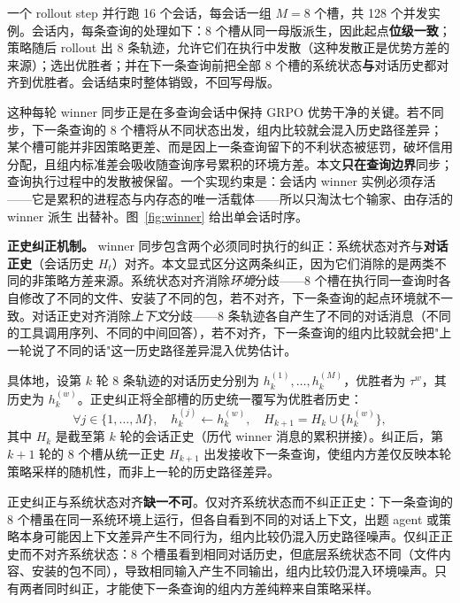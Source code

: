 一个 rollout step 并行跑 16 个会话，每会话一组 $M=8$ 个槽，共 128 个并发实例。会话内，每条查询的处理如下：8 个槽从同一母版派生，因此起点\textbf{位级一致}；策略随后 rollout 出 8 条轨迹，允许它们在执行中发散（这种发散正是优势方差的来源）；选出优胜者；并在下一条查询前把全部 8 个槽的系统状态\textbf{与}对话历史都对齐到优胜者。会话结束时整体销毁，不回写母版。

这种每轮 winner 同步正是在多查询会话中保持 GRPO 优势干净的关键。若不同步，下一条查询的 8 个槽将从不同状态出发，组内比较就会混入历史路径差异；某个槽可能并非因策略更差、而是因上一条查询留下的不利状态被惩罚，破坏信用分配，且组内标准差会吸收随查询序号累积的环境方差。本文\textbf{只在查询边界}同步；查询执行过程中的发散被保留。一个实现约束是：会话内 winner 实例必须存活——它是累积的进程态与内存态的唯一活载体——所以只淘汰七个输家、由存活的 winner 派生 出替补。图~\ref{fig:winner} 给出单会话时序。

\textbf{正史纠正机制。} winner 同步包含两个必须同时执行的纠正：系统状态对齐与\textbf{对话正史}（会话历史 $H_t$）对齐。本文显式区分这两条纠正，因为它们消除的是两类不同的非策略方差来源。系统状态对齐消除\textit{环境}分歧——8 个槽在执行同一查询时各自修改了不同的文件、安装了不同的包，若不对齐，下一条查询的起点环境就不一致。对话正史对齐消除\textit{上下文}分歧——8 条轨迹各自产生了不同的对话消息（不同的工具调用序列、不同的中间回答），若不对齐，下一条查询的组内比较就会把"上一轮说了不同的话"这一历史路径差异混入优势估计。

具体地，设第 $k$ 轮 8 条轨迹的对话历史分别为 $h_k^{(1)},\dots,h_k^{(M)}$，优胜者为 $\tau^w$，其历史为 $h_k^{(w)}$。正史纠正将全部槽的历史统一覆写为优胜者历史：
\begin{equation}
\label{eq:history-correct}
\forall j\in\{1,\dots,M\},\quad h_k^{(j)} \gets h_k^{(w)}, \quad H_{k+1} = H_k \cup \{h_k^{(w)}\},
\end{equation}
其中 $H_k$ 是截至第 $k$ 轮的会话正史（历代 winner 消息的累积拼接）。纠正后，第 $k{+}1$ 轮的 8 个槽从统一正史 $H_{k+1}$ 出发接收下一条查询，使组内方差仅反映本轮策略采样的随机性，而非上一轮的历史路径差异。

正史纠正与系统状态对齐\textbf{缺一不可}。仅对齐系统状态而不纠正正史：下一条查询的 8 个槽虽在同一系统环境上运行，但各自看到不同的对话上下文，出题 agent 或策略本身可能因上下文差异产生不同行为，组内比较仍混入历史路径噪声。仅纠正正史而不对齐系统状态：8 个槽虽看到相同对话历史，但底层系统状态不同（文件内容、安装的包不同），导致相同输入产生不同输出，组内比较仍混入环境噪声。只有两者同时纠正，才能使下一条查询的组内方差纯粹来自策略采样。

